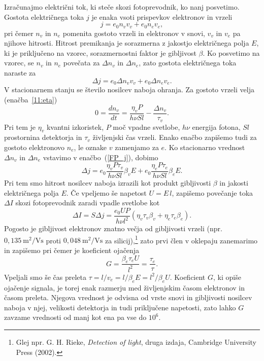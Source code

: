 Izračunajmo električni tok, ki steče skozi fotoprevodnik, ko nanj posvetimo. 
Gostota električnega toka $j$ je enaka vsoti prispevkov elektronov  in 
vrzeli
\begin{equation}
j = e_0 n_v v_v + e_0 n_e v_e,
\end{equation}
pri čemer $n_v$ in $n_e$ pomenita gostoto vrzeli in elektronov v snovi, $v_v$ in $v_e$ pa 
njihove hitrosti. Hitrost premikanja 
je sorazmerna z jakostjo električnega polja $E$, ki je priključeno
 na vzorec, sorazmernostni faktor je gibljivost $\beta$. Ko posvetimo na vzorec, 
 se $n_v$ in $n_e$ povečata za $\Delta n_v$ in $\Delta n_e$, zato
gostota električnega toka naraste za
\begin{equation}
\Delta j = e_0 \Delta n_v v_v + e_0 \Delta n_e v_e.
\label{FP_j}
\end{equation}
V stacionarnem stanju se število nosilcev naboja ohranja. Za gostoto vrzeli velja 
(enačba~\ref{11:eta})
\begin{equation}
0 = \frac{dn_v}{dt} = \frac{\eta_v P}{h \nu Sl} - \frac{\Delta n_v}{\tau_v}.
\end{equation}
Pri tem je $\eta_v$ kvantni izkoristek, $P$ moč vpadne svetlobe, $h\nu$ energija fotona,
$Sl$ prostornina detektorja in $\tau_v$ življenjski čas vrzeli. Enako enačbo 
zapišemo tudi za gostoto elektronovo $n_e$, le oznake $v$ zamenjamo za $e$. 
Ko stacionarno vrednost $\Delta n_v$ in $\Delta n_e$ vstavimo v enačbo~(\ref{FP_j}), dobimo
\begin{equation}
\Delta j = e_0 \frac{\eta_v P \tau_v}{h \nu Sl} \beta_v  E + 
e_0 \frac{\eta_e P \tau_e}{h \nu Sl} \beta_e  E.
\end{equation}
Pri tem smo hitrost nosilcev naboja izrazili kot produkt gibljivosti $\beta$ in jakosti
električnega polja $E$. Če vpeljemo še napetost $U = E\,l$, zapišemo povečanje toka $\Delta I$
skozi fotoprevodnik zaradi vpadle svetlobe kot
\begin{equation}
\Delta I = S\Delta j = \frac{e_0 U P }{h \nu l^2} \left(\eta_v \tau_v \beta_v + 
\eta_e \tau_e \beta_e \right).
\end{equation}
Pogosto je gibljivost elektronov znatno večja od gibljivosti vrzeli (npr.
$0,135~\si{\meter}^2/\si{\volt\second}$ proti $0,048~\si{\meter}^2/\si{\volt\second}$ za
silicij),\footnote{Glej npr. G. H. Rieke, {\it Detection 
of light}, druga izdaja, Cambridge University Press (2002).} 
 zato prvi člen v oklepaju zanemarimo in zapišemo
pri čemer je koeficient ojačenja 
\begin{equation}
G = \frac{\beta_e \tau_e U}{l^2} = \frac{\tau_e}{\tau}.
\end{equation}
Vpeljali smo še čas preleta $\tau = l/v_e = l/\beta_e E = l^2/\beta_e U$.
\newpage
Koeficient $G$, ki opiše ojačenje signala, je torej enak razmerju med 
življenjskim časom elektronov in časom preleta. 
Njegova vrednost je odvisna od 
vrste snovi in gibljivosti nosilcev naboja v njej, velikosti
detektorja in tudi priključene napetosti, zato lahko $G$ zavzame vrednosti od manj kot ena pa
vse do $10^6$. 

